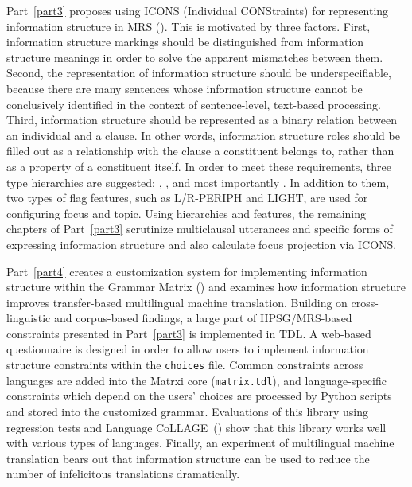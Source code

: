 Part~\ref{part3} proposes using ICONS (Individual CONStraints) for
representing information structure in MRS
(\citealt{copestake:etal:05}).  This is motivated by three factors.
First, information structure markings should be distinguished from
information structure meanings in order to solve the apparent
mismatches between them. Second, the representation of information
structure should be underspecifiable, because there are many sentences
whose information structure cannot be conclusively identified in the
context of sentence-level, text-based processing. Third, information
structure should be represented as a binary relation between an
individual and a clause. In other words, information structure roles
should be filled out as a relationship with the clause a constituent
belongs to, rather than as a property of a constituent itself. In
order to meet these requirements, three type hierarchies are
suggested; , , and most importantly
. In addition to them, two types of flag features, such
as L/R-PERIPH and LIGHT, are used for configuring focus and
topic. Using hierarchies and features, the remaining chapters of
Part~\ref{part3} scrutinize multiclausal utterances and specific forms
of expressing information structure and also calculate focus
projection via ICONS.


Part~\ref{part4} creates a customization system for implementing
information structure within the \lingo Grammar Matrix
(\citealt{bender:etal:10}) and examines how information structure
improves transfer-based multilingual machine translation. Building
on cross-linguistic and corpus-based findings, a large part of
HPSG/MRS-based constraints presented in Part~\ref{part3} is
implemented in TDL. A web-based questionnaire is designed in order to
allow users to implement information structure constraints within the
\texttt{choices} file. Common constraints across languages are added
into the Matrxi core (\texttt{matrix.tdl}),
and language-specific constraints which
depend on the users' choices are processed by Python scripts and
stored into the customized grammar. Evaluations of this library using
regression tests and Language 
CoLLAGE~() 
show that
this library works well with various types of languages. Finally, an
experiment of multilingual machine translation bears out that
information structure can be used to reduce the number of infelicitous
translations dramatically.





